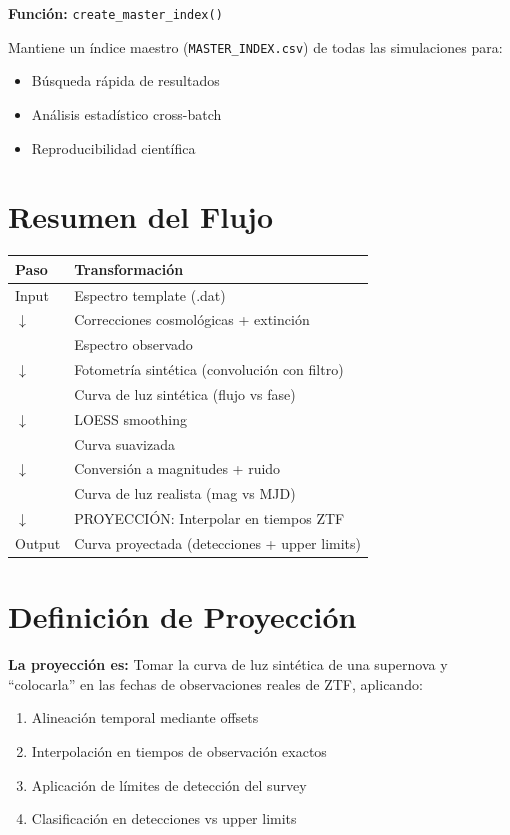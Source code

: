 \documentclass[11pt,a4paper]{article}
\begin{document}
\textbf{Función:} \texttt{create\_master\_index()}

Mantiene un índice maestro (\texttt{MASTER\_INDEX.csv}) de todas las simulaciones para:
\begin{itemize}
    \item Búsqueda rápida de resultados
    \item Análisis estadístico cross-batch
    \item Reproducibilidad científica
\end{itemize}

\section{Resumen del Flujo}

\begin{center}
\begin{tabular}{ll}
\hline
\textbf{Paso} & \textbf{Transformación} \\
\hline
Input & Espectro template (.dat) \\
$\downarrow$ & Correcciones cosmológicas + extinción \\
& Espectro observado \\
$\downarrow$ & Fotometría sintética (convolución con filtro) \\
& Curva de luz sintética (flujo vs fase) \\
$\downarrow$ & LOESS smoothing \\
& Curva suavizada \\
$\downarrow$ & Conversión a magnitudes + ruido \\
& Curva de luz realista (mag vs MJD) \\
$\downarrow$ & PROYECCIÓN: Interpolar en tiempos ZTF \\
Output & Curva proyectada (detecciones + upper limits) \\
\hline
\end{tabular}
\end{center}

\section{Definición de Proyección}

\textbf{La proyección es:} Tomar la curva de luz sintética de una supernova y ``colocarla'' en las fechas de observaciones reales de ZTF, aplicando:
\begin{enumerate}
    \item Alineación temporal mediante offsets
    \item Interpolación en tiempos de observación exactos
    \item Aplicación de límites de detección del survey
    \item Clasificación en detecciones vs upper limits
\end{enumerate}
\end{document}
